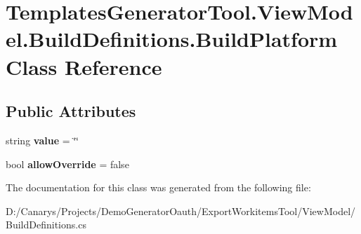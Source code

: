 \hypertarget{class_templates_generator_tool_1_1_view_model_1_1_build_definitions_1_1_build_platform}{}\section{Templates\+Generator\+Tool.\+View\+Model.\+Build\+Definitions.\+Build\+Platform Class Reference}
\label{class_templates_generator_tool_1_1_view_model_1_1_build_definitions_1_1_build_platform}
\subsection*{Public Attributes}
\begin{DoxyCompactItemize}
\item 
\mbox{\label{class_templates_generator_tool_1_1_view_model_1_1_build_definitions_1_1_build_platform_aba321b9fc1940cd61c9576c3892f4663}} 
string {\bfseries value} = \char`\"{}\char`\"{}
\item 
\mbox{\label{class_templates_generator_tool_1_1_view_model_1_1_build_definitions_1_1_build_platform_a9a74374405de9a9a411741f8fc5af786}} 
bool {\bfseries allow\+Override} = false
\end{DoxyCompactItemize}


The documentation for this class was generated from the following file\+:\begin{DoxyCompactItemize}
\item 
D\+:/\+Canarys/\+Projects/\+Demo\+Generator\+Oauth/\+Export\+Workitems\+Tool/\+View\+Model/Build\+Definitions.\+cs\end{DoxyCompactItemize}

